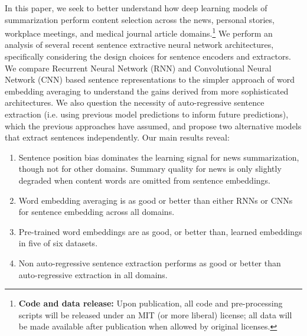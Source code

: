 In this paper, we seek to better understand how deep learning models of 
summarization perform content selection across the news, personal stories,
workplace meetings, and medical journal article domains.\footnote{\textbf{Code and data release:} Upon
publication, all code and pre-processing scripts
will be released under an MIT (or more liberal)
license; all data will be made available after
publication when allowed by original licenses.}
We perform an analysis 
of several recent sentence extractive neural network architectures, 
specifically considering the design choices for sentence encoders and 
extractors. We compare Recurrent Neural Network (RNN) and Convolutional Neural
Network (CNN) based sentence representations to the 
simpler approach of word embedding averaging to understand the gains 
derived from more sophisticated architectures.
We also question the necessity of auto-regressive sentence extraction 
(i.e. using previous model predictions to inform future predictions), 
which the previous approaches have assumed,
and propose two alternative models that extract sentences independently.
%
%
%
%
Our main results reveal:
\begin{enumerate}
\item Sentence position bias dominates the learning signal for news summarization, though not for
other domains. %
Summary quality for news is only slightly degraded when content words
are omitted from sentence embeddings. %
\item Word embedding averaging is as good or better than either RNNs or CNNs for sentence embedding across all domains.
\item Pre-trained word embeddings are as good, or better than, learned embeddings in five of six datasets.%
\item Non auto-regressive sentence extraction performs as good or better 
     than auto-regressive extraction in all
    domains.
\end{enumerate} 
